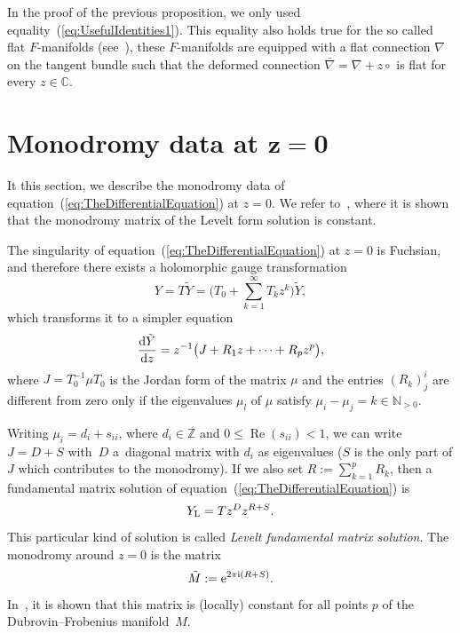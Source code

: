 \documentclass[10pt,a4paper]{amsart}
\numberwithin{equation}{section}
\begin{document}
 \begin{Remark}
 In the proof of the previous proposition, we only used equality~(\ref{eq:UsefulIdentities1}). This equality also holds true for the so called flat $F$-manifolds (see~\cite{https://doi.org/10.48550/arxiv.2001.05599,https://doi.org/10.48550/arxiv.2104.09380}), these $F$-manifolds are equipped with a flat connection $\nabla$ on the tangent bundle such that the deformed connection $\bar{\nabla}=\nabla+z\circ$ is flat for every $z\in\mathbb{C}$.
 \end{Remark}

\section[Monodromy data at z=0]{Monodromy data at $\boldsymbol{z=0}$}
 \label{sec:Monodromy}

 It this section, we describe the monodromy data of equation~(\ref{eq:TheDifferentialEquation}) at $z=0$. We refer to~\cite{Dubrovin:1994hc}, where it is shown that the monodromy matrix of the Levelt form solution is constant.

 The singularity of equation~(\ref{eq:TheDifferentialEquation}) at $z=0$ is Fuchsian, and therefore there exists a holomorphic gauge transformation
 \begin{equation*}
 Y=T\tilde{Y}=\Biggl( T_{0}+\sum_{k=1}^{\infty}T_{k}z^{k}\Biggr)\tilde{Y},
 \end{equation*}
 which transforms it to a simpler equation
 \begin{equation*}
 \frac{{\rm d}\tilde{Y}}{{\rm d}z}=z^{-1}\bigl(J+R_{1}z+\cdots+R_{p}z^{p} \bigr),
 \end{equation*}
 where $J=T_{0}^{-1}\mu T_{0}$ is the Jordan form of the matrix $\mu$ and the entries $(R_{k})_{j}^{i}$ are different from zero only if the eigenvalues $\mu_{l}$ of $\mu$ satisfy $\mu_{i}-\mu_{j}=k\in\mathbb{N}_{> 0}$.

 Writing $\mu_{i}=d_{i}+s_{ii}$, where $d_{i}\in\mathbb{Z}$ and $0\leq \operatorname{Re}(s_{ii})<1$,
 we can write $J=D+S$ with~$D$ a~diagonal matrix with $d_{i}$ as eigenvalues ($S$ is the only part of $J$ which contributes to the mono\-dromy). If we also set $R:=\sum_{k=1}^{p}R_{k}$, then a fundamental matrix solution of equation~(\ref{eq:TheDifferentialEquation}) is
 \begin{equation}
 \label{eq:LeveltSolution}
 Y_{\rm L}=Tz^{D}z^{R+S}.
 \end{equation}
 This particular kind of solution is called \emph{Levelt fundamental matrix solution}. The monodromy around $z=0$ is the matrix
 \begin{equation*}
 \tilde{M}:={\rm e}^{2\pi {\rm i}(R+S)}.
 \end{equation*}
 In~\cite{Dubrovin:1994hc}, it is shown that this matrix is (locally) constant for all points $p$ of the Dubrovin--Frobenius manifold~$M$.
\end{document}
